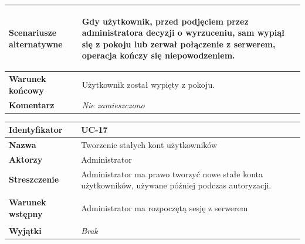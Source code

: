 {\begin{tabular}{ | l | l | }
	\hline
		\parbox[t]{4cm}{\textbf{Scenariusze alternatywne}} & \parbox[t]
		{11cm}{
			\begin{enumreq}
				\item Gdy użytkownik, przed podjęciem przez administratora 
				decyzji o wyrzuceniu, sam wypiął się z pokoju lub zerwał
				połączenie z serwerem, operacja kończy się niepowodzeniem.
			\end{enumreq}
		}
		\\
		
	\hline
		\parbox[t]{4cm}{\textbf{Warunek końcowy}} & \parbox[t]{11cm}{
			Użytkownik został wypięty z pokoju.
		}
		\\
		
	\hline
		\parbox[t]{4cm}{\textbf{Komentarz}} & \parbox[t]{11cm}{
			\textit{Nie zamieszczono}
		}
		\\

	\hline
\end{tabular}


\vspace{2em}

\begin{tabular}{ | l | l | }
	\hline
		\textbf{Identyfikator} & 
		UC-17
		\\
		
	\hline
		\textbf{Nazwa} & 
		Tworzenie stałych kont użytkowników
		\\
		
	\hline
		\textbf{Aktorzy} & \parbox[t]{11cm}{
			Administrator
		}\\
		 
	\hline
		\parbox[t]{4cm}{\textbf{Streszczenie}} & \parbox[t]{11cm}{
			Administrator ma prawo tworzyć nowe stałe konta użytkowników,
			używane później podczas autoryzacji.
			
		}\\
		
	\hline
		\parbox[t]{4cm}{\textbf{Warunek wstępny}} & \parbox[t]{11cm}{
			\begin{enumreq}
				\item Administrator ma rozpoczętą sesję z serwerem
			\end{enumreq}
				
		}
		\\
		
	\hline
		\parbox[t]{4cm}{\textbf{Wyjątki}} & \parbox[t]{11cm}{
			\textit{Brak}
			
		}
		\\


\end{tabular}}
